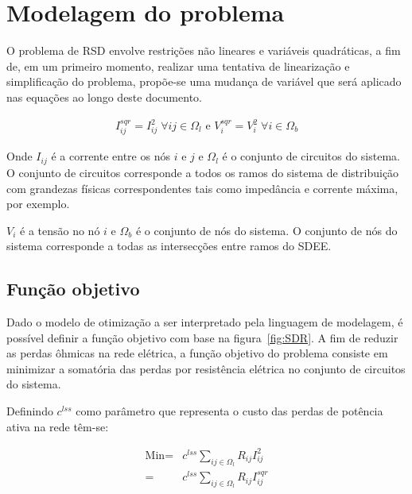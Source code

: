 \section{Modelagem do problema}

O problema de RSD envolve restrições não lineares e variáveis quadráticas, a fim de, em um primeiro momento, realizar uma tentativa de linearização e simplificação do problema, propõe-se uma mudança de variável que será aplicado nas equações ao longo deste documento.

\begin{align}
    I_{ij}^{sqr} = I_{ij}^{2}\;\forall ij \in \Omega_l \text{ e } V_{i}^{sqr} = V_{i}^{2}\; \forall i\in\Omega_b 
    \label{eq:change_variable}
\end{align}

Onde $I_{ij}$ é a corrente entre os nós $i$ e $j$ e $\Omega_l$ é o conjunto de circuitos do sistema.
O conjunto de circuitos corresponde a todos os ramos do sistema de distribuição com grandezas físicas correspondentes tais como impedância e corrente máxima, por exemplo.

$V_i$ é a tensão no nó $i$ e $\Omega_b$ é o conjunto de nós do sistema.
O conjunto de nós do sistema corresponde a todas as intersecções entre ramos do SDEE.

\subsection{Função objetivo}

Dado o modelo de otimização a ser interpretado pela linguagem de modelagem, é possível definir a função objetivo com base na figura~\ref{fig:SDR}.
A fim de reduzir as perdas ôhmicas na rede elétrica, a função objetivo do problema consiste em minimizar a somatória das perdas por resistência elétrica no conjunto de circuitos do sistema.

Definindo $c^{lss}$ como parâmetro que representa o custo das perdas de potência ativa na rede têm-se:

\begin{equation}
    \begin{split}
        \text{Min} = & c^{lss}\sum_{ij\in\Omega_{l}}R_{ij}I_{ij}^{2}\\
        = & c^{lss}\sum_{ij\in\Omega_{l}}R_{ij}I_{ij}^{sqr}
    \end{split}
    \label{eq:funcobjetivo}
\end{equation}
